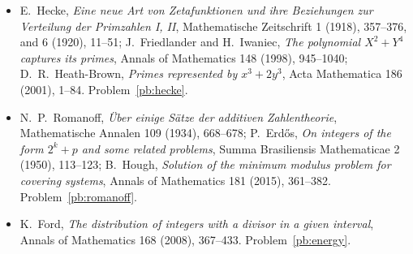 \begin{itemize}
\item E.~Hecke, \emph{Eine neue Art von Zetafunktionen und ihre Beziehungen zur Verteilung der Primzahlen I, II}, Mathematische Zeitschrift 1 (1918), 357--376, and 6 (1920), 11--51; J.~Friedlander and H.~Iwaniec, \emph{The polynomial $X^2+Y^4$ captures its primes}, Annals of Mathematics 148 (1998), 945--1040; D.~R.~Heath-Brown, \emph{Primes represented by $x^3+2y^3$}, Acta Mathematica 186 (2001), 1--84. Problem~\ref{pb:hecke}.
\item N.~P.~Romanoff, \emph{Über einige Sätze der additiven Zahlentheorie}, Mathematische Annalen 109 (1934), 668--678; P.~Erd\H os, \emph{On integers of the form $2^k+p$ and some related problems}, Summa Brasiliensis Mathematicae 2 (1950), 113--123; B.~Hough, \emph{Solution of the minimum modulus problem for covering systems}, Annals of Mathematics 181 (2015), 361--382. Problem~\ref{pb:romanoff}.
\item K.~Ford, \emph{The distribution of integers with a divisor in a given interval}, Annals of Mathematics 168 (2008), 367--433. Problem~\ref{pb:energy}.
\end{itemize}
